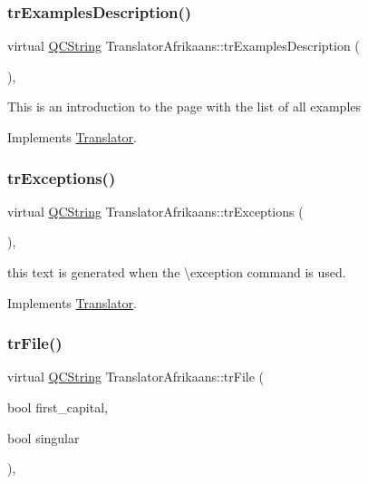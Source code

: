 \subsubsection{\texorpdfstring{trExamplesDescription()}{trExamplesDescription()}}
{\footnotesize\ttfamily virtual \mbox{\hyperlink{class_q_c_string}{Q\+C\+String}} Translator\+Afrikaans\+::tr\+Examples\+Description (\begin{DoxyParamCaption}{ }\end{DoxyParamCaption})\hspace{0.3cm}{\ttfamily [inline]}, {\ttfamily [virtual]}}

This is an introduction to the page with the list of all examples 

Implements \mbox{\hyperlink{class_translator}{Translator}}.

\mbox{\label{class_translator_afrikaans_a0da5dd0dae10e1d3474cf0b65d41f7fe}} 
\subsubsection{\texorpdfstring{trExceptions()}{trExceptions()}}
{\footnotesize\ttfamily virtual \mbox{\hyperlink{class_q_c_string}{Q\+C\+String}} Translator\+Afrikaans\+::tr\+Exceptions (\begin{DoxyParamCaption}{ }\end{DoxyParamCaption})\hspace{0.3cm}{\ttfamily [inline]}, {\ttfamily [virtual]}}

this text is generated when the \textbackslash{}exception command is used. 

Implements \mbox{\hyperlink{class_translator}{Translator}}.

\mbox{\label{class_translator_afrikaans_a01377a4168d5fda632b2812dd1e37e91}} 
\subsubsection{\texorpdfstring{trFile()}{trFile()}}
{\footnotesize\ttfamily virtual \mbox{\hyperlink{class_q_c_string}{Q\+C\+String}} Translator\+Afrikaans\+::tr\+File (\begin{DoxyParamCaption}\item[{bool}]{first\+\_\+capital,  }\item[{bool}]{singular }\end{DoxyParamCaption})\hspace{0.3cm}{\ttfamily [inline]}, {\ttfamily [virtual]}}

